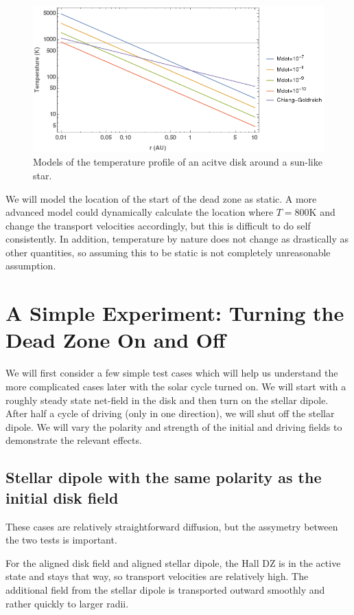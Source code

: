 \begin{figure}[h!]
\centering
\includegraphics[width=0.8\columnwidth]{figs/figsChapter3/TemperatureProfiles.png}
\caption{Models of the temperature profile of an acitve disk around a sun-like star.}
\label{fiStExample}
\end{figure}

We will model the location of the start of the dead zone as static.  A more advanced model could dynamically calculate the location where $T=800$K and change the transport velocities accordingly, but this is difficult to do self consistently.  In addition, temperature by nature does not change as drastically as other quantities, so assuming this to be static is not completely unreasonable assumption.





\section{A Simple Experiment: Turning the Dead Zone On and Off}
We will first consider a few simple test cases which will help us understand the more complicated cases later with the solar cycle turned on.  We will start with a roughly steady state net-field in the disk and then turn on the stellar dipole.  After half a cycle of driving (only in one direction), we will shut off the stellar dipole.  We will vary the polarity and strength of the initial and driving fields to demonstrate the relevant effects. 


\subsection{Stellar dipole with the same polarity as the initial disk field}
These cases are relatively straightforward diffusion, but the assymetry between the two tests is important.

For the aligned disk field and aligned stellar dipole, the Hall DZ is in the active state and stays that way, so transport velocities are relatively high.  The additional field from the stellar dipole is transported outward smoothly and rather quickly to larger radii.  

